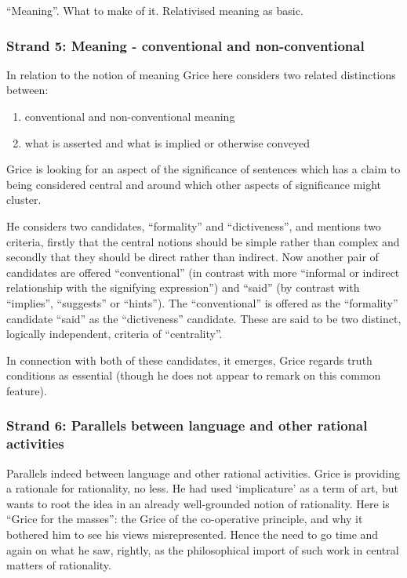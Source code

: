 \documentclass[10pt,titlepage]{book}
\begin{document}
``Meaning''.
What to make of it.
Relativised meaning as basic.

\subsubsection{Strand 5: Meaning - conventional and non-conventional}

In relation to the notion of meaning Grice here considers two related distinctions between:

\begin{enumerate}
\item conventional and non-conventional meaning
\item what is asserted and what is implied or otherwise conveyed
\end{enumerate}

Grice is looking for an aspect of the significance of sentences which has a claim to being considered central and around which other aspects of significance might cluster.

He considers two candidates, ``formality'' and ``dictiveness'', and mentions two criteria, firstly that the central notions should be simple rather than complex and secondly that they should be direct rather than indirect. Now another pair of candidates are offered ``conventional'' (in contrast with more ``informal or indirect relationship with the signifying expression'') and ``said'' (by contrast with ``implies'', ``suggests'' or ``hints''). The ``conventional'' is offered as the ``formality'' candidate ``said'' as the ``dictiveness'' candidate. These are said to be two distinct, logically independent, criteria of ``centrality''.

In connection with both of these candidates, it emerges, Grice regards truth conditions as essential (though he does not appear to remark on this common feature). 

\subsubsection{Strand 6: Parallels between language and other rational activities}

Parallels indeed between language and other rational activities.
Grice is providing a rationale for rationality, no less. He had used `implicature' as 
a  term of art, but wants to root the idea in an already well-grounded 
notion of  rationality. Here is ``Grice for the masses'': the Grice of the 
co-operative  principle, and why it bothered him to see his views misrepresented. 
Hence the  need to go time and again on what he saw, rightly, as the 
philosophical import  of such work in central matters of rationality.
\end{document}
